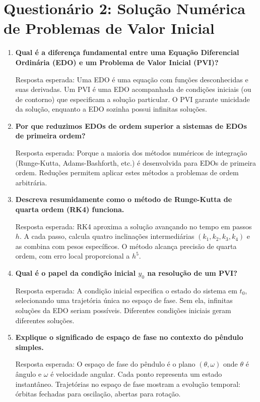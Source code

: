\documentclass[12pt,a4paper]{article}
\begin{document}
\newpage


\section{Questionário 2: Solução Numérica de Problemas de Valor Inicial}

\begin{enumerate}
    \item \textbf{Qual é a diferença fundamental entre uma Equação Diferencial Ordinária (EDO) e um Problema de Valor Inicial (PVI)?} \par
    Resposta esperada: Uma EDO é uma equação com funções desconhecidas e suas derivadas. Um PVI é uma EDO acompanhada de condições iniciais (ou de contorno) que especificam a solução particular. O PVI garante unicidade da solução, enquanto a EDO sozinha possui infinitas soluções.
    
    \item \textbf{Por que reduzimos EDOs de ordem superior a sistemas de EDOs de primeira ordem?} \par
    Resposta esperada: Porque a maioria dos métodos numéricos de integração (Runge-Kutta, Adams-Bashforth, etc.) é desenvolvida para EDOs de primeira ordem. Reduções permitem aplicar estes métodos a problemas de ordem arbitrária.
    
    \item \textbf{Descreva resumidamente como o método de Runge-Kutta de quarta ordem (RK4) funciona.} \par
    Resposta esperada: RK4 aproxima a solução avançando no tempo em passos $h$. A cada passo, calcula quatro inclinações intermediárias $(k_1, k_2, k_3, k_4)$ e as combina com pesos específicos. O método alcança precisão de quarta ordem, com erro local proporcional a $h^5$.
    
    \item \textbf{Qual é o papel da condição inicial $y_0$ na resolução de um PVI?} \par
    Resposta esperada: A condição inicial especifica o estado do sistema em $t_0$, selecionando uma trajetória única no espaço de fase. Sem ela, infinitas soluções da EDO seriam possíveis. Diferentes condições iniciais geram diferentes soluções.
    
    \item \textbf{Explique o significado de espaço de fase no contexto do pêndulo simples.} \par
    Resposta esperada: O espaço de fase do pêndulo é o plano $(\theta, \omega)$ onde $\theta$ é ângulo e $\omega$ é velocidade angular. Cada ponto representa um estado instantâneo. Trajetórias no espaço de fase mostram a evolução temporal: órbitas fechadas para oscilação, abertas para rotação.
    

\end{enumerate}
\end{document}
